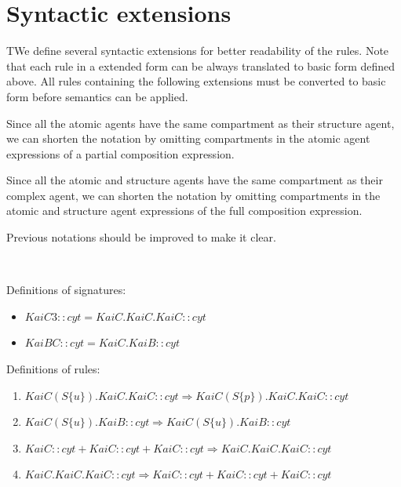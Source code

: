 \documentclass[12pt]{fithesis2}
\begin{document}
\section{Syntactic extensions}

TWe define several syntactic extensions for better readability of the rules. Note that each rule in a extended form can be always translated to basic form defined above. All rules containing the following extensions must be converted to basic form before semantics can be applied.

\begin{notation}\label{shortcut:structure}
Since all the atomic agents have the same compartment as their structure agent, we can shorten the notation by omitting compartments in the atomic agent expressions of a partial composition expression.
\end{notation}

\begin{notation}\label{shortcut:complex}
Since all the atomic and structure agents have the same compartment as their complex agent, we can shorten the notation by omitting compartments in the atomic and structure agent expressions of the full composition expression.
\end{notation}

Previous notations should be improved to make it clear.

\begin{runningExample}\label{run1}
$ $

\noindent Definitions of signatures: 
\begin{itemize}
\item $KaiC3::cyt = KaiC.KaiC.KaiC::cyt$
\item $KaiBC::cyt = KaiC.KaiB::cyt$
\end{itemize}

\noindent Definitions of rules:
\begin{enumerate}
\item $KaiC(S\{u\}).KaiC.KaiC::cyt \Rightarrow KaiC(S\{p\}).KaiC.KaiC::cyt$
\item $KaiC(S\{u\}).KaiB::cyt \Rightarrow KaiC(S\{u\}).KaiB::cyt$
\item $KaiC::cyt + KaiC::cyt + KaiC::cyt \Rightarrow KaiC.KaiC.KaiC::cyt$
\item $KaiC.KaiC.KaiC::cyt \Rightarrow KaiC::cyt + KaiC::cyt + KaiC::cyt$
\end{enumerate}
\end{runningExample}
\end{document}
